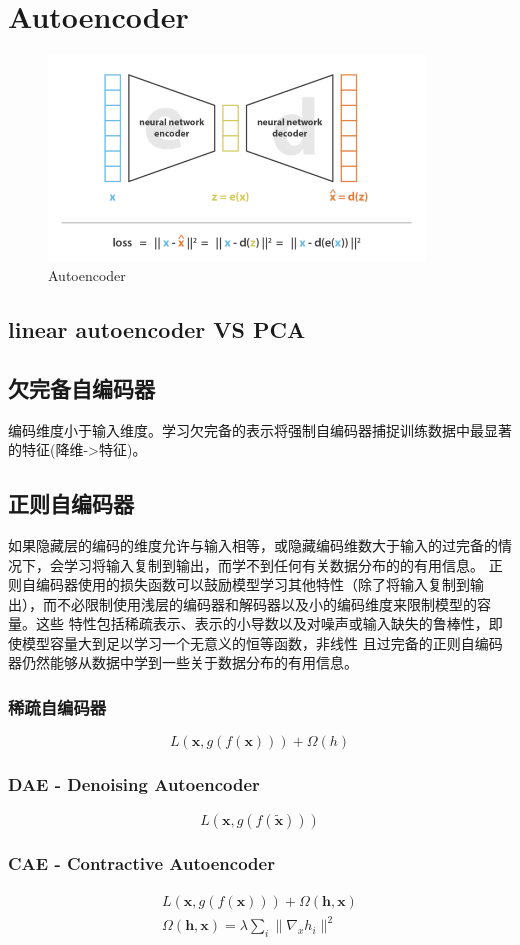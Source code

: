 \chapter{Autoencoder}

\begin{figure}[H]
    \centering
    \includegraphics[width=10cm]{images/ae.png}
    \caption{Autoencoder}
    \label{fig:autoencoder}
\end{figure}
\section{linear autoencoder VS PCA}
\section{欠完备自编码器}
编码维度小于输入维度。学习欠完备的表示将强制自编码器捕捉训练数据中最显著的特征(降维->特征)。

\section{正则自编码器}
如果隐藏层的编码的维度允许与输入相等，或隐藏编码维数大于输入的过完备的情况下，会学习将输入复制到输出，而学不到任何有关数据分布的的有用信息。
正则自编码器使用的损失函数可以鼓励模型学习其他特性（除了将输入复制到输出），而不必限制使用浅层的编码器和解码器以及小的编码维度来限制模型的容量。这些
特性包括稀疏表示、表示的小导数以及对噪声或输入缺失的鲁棒性，即使模型容量大到足以学习一个无意义的恒等函数，非线性
且过完备的正则自编码器仍然能够从数据中学到一些关于数据分布的有用信息。

\subsection{稀疏自编码器}
\begin{equation}
    L(\mathbf{x}, g(f(\mathbf{x}))) + \Omega (h)
\end{equation}
\subsection{DAE - Denoising Autoencoder}
\begin{equation}
    L(\mathbf{x}, g(f(\tilde{\mathbf{x}})))
\end{equation}
\subsection{CAE - Contractive Autoencoder}
\begin{equation}
    \begin{split}
        L(\mathbf{x}, g(f(\mathbf{x}))) + \Omega(\mathbf{h}, \mathbf{x}) \\
        \Omega(\mathbf{h}, \mathbf{x}) = \lambda \sum_i \| \nabla_x h_i \|^2
    \end{split}
\end{equation}

